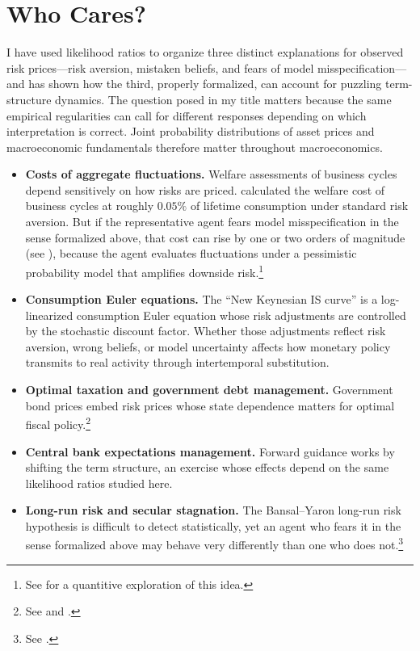 \documentclass[12pt]{article}
\theoremstyle{definition}
\begin{document}
\section{Who Cares?}
\label{sec:conclusion}

I have used likelihood ratios to organize three distinct explanations for observed risk prices---risk aversion, mistaken beliefs, and fears of model misspecification---and has shown how the third, properly formalized, can account for puzzling term-structure dynamics.
The question posed in my  title matters because the same empirical regularities can call for different responses  depending on which interpretation is correct. Joint probability distributions of asset prices and macroeconomic fundamentals therefore matter throughout macroeconomics.

\begin{itemize}
\item \textbf{Costs of aggregate fluctuations.}  Welfare assessments of
      business cycles depend sensitively on how risks are priced.
      \citet{Lucas1987} calculated the welfare cost of business cycles at
      roughly $0.05\%$ of lifetime consumption under standard risk
      aversion.  But if the representative agent fears model
      misspecification in the sense formalized above, that cost can rise
      by one or two orders of magnitude (see \citep{HST1999}), because the agent evaluates fluctuations under a
      pessimistic probability model that amplifies downside risk.\footnote{ See \citet{barillas2009doubts} for a  quantitive exploration of this idea.}
\item \textbf{Consumption Euler equations.}  The ``New Keynesian IS
      curve'' is a log-linearized consumption Euler equation whose risk
      adjustments are controlled by the stochastic discount factor.
      Whether those adjustments reflect risk aversion, wrong beliefs, or model uncertainty affects how monetary policy transmits to real activity through intertemporal substitution.
\item \textbf{Optimal taxation and government debt management.}
       Government bond prices embed risk prices whose state dependence
       matters for optimal fiscal policy.\footnote{See \citet{Karantounias2013} and \citet{FerrierKarantounias2019}.}
\item \textbf{Central bank expectations management.}  Forward guidance
      works by shifting the term structure, an exercise whose effects
      depend on the same likelihood ratios studied here.
\item \textbf{Long-run risk and secular stagnation.}  The Bansal--Yaron
      long-run risk hypothesis is difficult to detect statistically, yet
      an agent who fears it in the sense formalized above may behave
      very differently than one who does not.\footnote{See \citet{hansen2010fragile}.}
\end{itemize}
\end{document}
